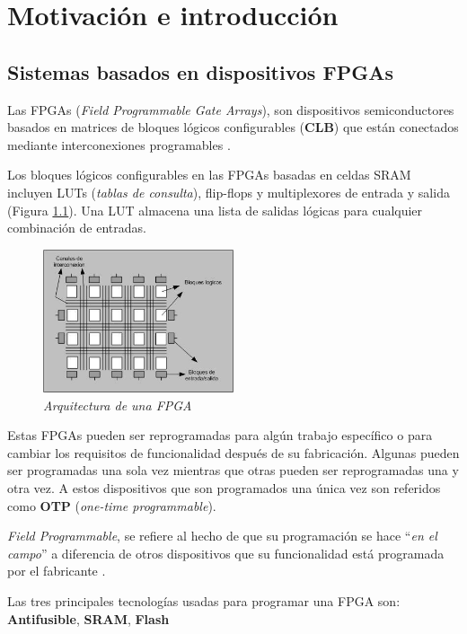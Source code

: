 \chapter{Motivación e introducción}


\section{Sistemas basados en dispositivos FPGAs} 

Las FPGAs (\textit{Field Programmable Gate Arrays}), son dispositivos semiconductores basados en matrices de bloques lógicos configurables
(\textbf{CLB}) que están conectados mediante interconexiones programables \cite{fpga_xilinx}. 

Los bloques lógicos configurables en las FPGAs basadas en celdas SRAM incluyen LUTs (\textit{tablas de consulta}), flip-flops y 
multiplexores de entrada y salida (Figura \ref{arqFPGA}). Una LUT almacena una lista de salidas lógicas para cualquier combinación de 
entradas.

\begin{figure}[H]
    \centering
    \includegraphics[width = 0.5\textwidth]{imagenes/arqFPGA.png}
    \caption{\textit{Arquitectura de una FPGA}}\label{arqFPGA}
\end{figure}

Estas FPGAs pueden ser reprogramadas para  algún trabajo específico o para cambiar los requisitos de funcionalidad después de su 
fabricación. Algunas pueden ser programadas una sola vez mientras que otras pueden ser reprogramadas una y otra vez. A estos 
dispositivos que son programados una única vez son referidos como \textbf{OTP} (\textit{one-time programmable}).

\textit{Field Programmable}, se refiere al hecho de que su programación se hace ``\textit{en el campo}'' a diferencia de otros dispositivos 
que su funcionalidad está programada por el fabricante \cite{maxfield1}.

Las tres principales tecnologías usadas para programar una FPGA son: \textbf{Antifusible}, \textbf{SRAM}, \textbf{Flash}


